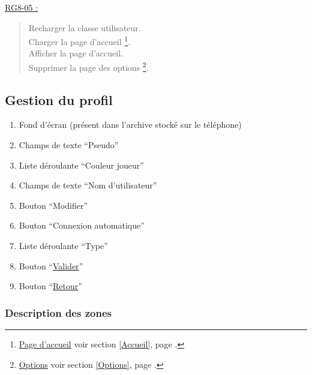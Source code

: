 \documentclass{report}
\begin{document}
				
			\underline{RG8-05 :}
				\begin{quote}
					Recharger la classe utilisateur.\\
					Charger la page d'accueil%
						\footnote[3]{
							\hyperlink{Page d'accueil}{Page d'accueil}
							\og voir section \ref{Accueil}, page \pageref{Accueil}.\fg
						}.\\
					Afficher la page d'accueil\footnotemark[3].\\
					Supprimer la page des options%
						\footnote[2]{
							\hyperlink{Options}{Options}
							\og voir section \ref{Options}, page \pageref{Options}.\fg
						}.\\		
				\end{quote}
\newpage

	\subsection{Gestion du profil}
	
		\hypertarget{Gestion du profil}{}
		\label{Gestion du profil}
		
		\begin{center}
			
		\end{center}
				
		\begin{enumerate}
		  \item Fond d'écran (présent dans l'archive stocké sur le téléphone)
		  \item Champs de texte ``Pseudo''
		  \item Liste déroulante ``Couleur joueur''
		  \item Champs de texte ``Nom d'utilisateur''
		  \item Bouton ``Modifier''
		  \item Bouton ``Connexion automatique''
		  \item Liste déroulante ``Type''
		  \item Bouton ``\hyperlink{Options}{Valider}''
		  \item Bouton ``\hyperlink{Options}{Retour}''
		\end{enumerate}

		\subsubsection{Description des zones}
		
\end{document}
